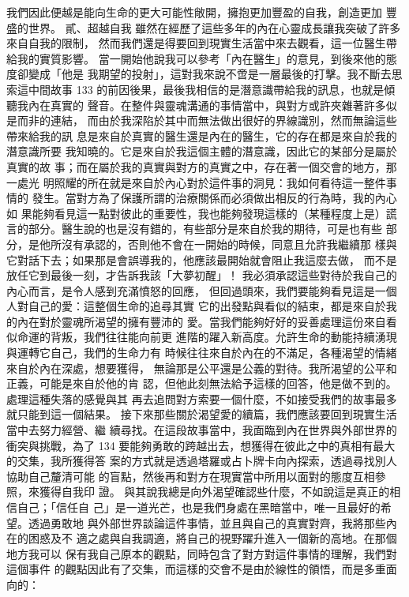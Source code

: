 我們因此便越是能向生命的更大可能性敞開，擁抱更加豐盈的自我，創造更加
豐盛的世界。 
貳、超越自我 
雖然在經歷了這些多年的內在心靈成長讓我突破了許多來自自我的限制，
然而我們還是得要回到現實生活當中來去觀看，這一位醫生帶給我的實質影響。
當一開始他說我可以參考「內在醫生」的意見，到後來他的態度卻變成「他是
我期望的投射」，這對我來說不啻是一層最後的打擊。我不斷去思索這中間故事
133 
的前因後果，最後我相信的是潛意識帶給我的訊息，也就是傾聽我內在真實的
聲音。在整件與靈魂溝通的事情當中，與對方或許夾雜著許多似是而非的連結，
而由於我深陷於其中而無法做出很好的界線識別，然而無論這些帶來給我的訊
息是來自於真實的醫生還是內在的醫生，它的存在都是來自於我的潛意識所要
我知曉的。它是來自於我這個主體的潛意識，因此它的某部分是屬於真實的故
事；而在屬於我的真實與對方的真實之中，存在著一個交會的地方，那一處光
明照耀的所在就是來自於內心對於這件事的洞見：我如何看待這一整件事情的
發生。當對方為了保護所謂的治療關係而必須做出相反的行為時，我的內心如
果能夠看見這一點對彼此的重要性，我也能夠發現這樣的（某種程度上是）謊
言的部分。醫生說的也是沒有錯的，有些部分是來自於我的期待，可是也有些
部分，是他所沒有承認的，否則他不會在一開始的時候，同意且允許我繼續那
樣與它對話下去；如果那是會誤導我的，他應該最開始就會阻止我這麼去做，
而不是放任它到最後一刻，才告訴我該「大夢初醒」！ 
我必須承認這些對待於我自己的內心而言，是令人感到充滿憤怒的回應，
但回過頭來，我們要能夠看見這是一個人對自己的愛：這整個生命的追尋其實
它的出發點與看似的結束，都是來自於我的內在對於靈魂所渴望的擁有豐沛的
愛。當我們能夠好好的妥善處理這份來自看似命運的背叛，我們往往能向前更
進階的躍入新高度。允許生命的動能持續湧現與運轉它自己，我們的生命力有
時候往往來自於內在的不滿足，各種渴望的情緒來自於內在深處，想要獲得，
無論那是公平還是公義的對待。我所渴望的公平和正義，可能是來自於他的肯
認，但他此刻無法給予這樣的回答，他是做不到的。處理這種失落的感覺與其
再去追問對方索要一個什麼，不如接受我們的故事最多就只能到這一個結果。
接下來那些關於渴望愛的續篇，我們應該要回到現實生活當中去努力經營、繼
續尋找。在這段故事當中，我面臨到內在世界與外部世界的衝突與挑戰，為了
134 
要能夠勇敢的跨越出去，想獲得在彼此之中的真相有最大的交集，我所獲得答
案的方式就是透過塔羅或占卜牌卡向內探索，透過尋找別人協助自己釐清可能
的盲點，然後再和對方在現實當中所用以面對的態度互相參照，來獲得自我印
證。 
與其說我總是向外渴望確認些什麼，不如說這是真正的相信自己；「信任自
己」是一道光芒，也是我們身處在黑暗當中，唯一且最好的希望。透過勇敢地
與外部世界談論這件事情，並且與自己的真實對齊，我將那些內在的困惑及不
適之處與自我調適，將自己的視野躍升進入一個新的高地。在那個地方我可以
保有我自己原本的觀點，同時包含了對方對這件事情的理解，我們對這個事件
的觀點因此有了交集，而這樣的交會不是由於線性的領悟，而是多重面向的：
